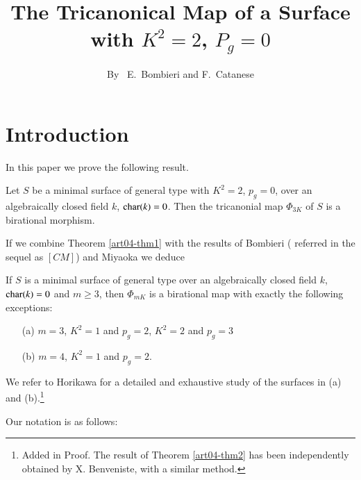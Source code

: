 \title{The Tricanonical Map of a Surface with \texorpdfstring{$K^{2}=2$, $P_{g}=0$}{K2}}\label{art04}

\author{By~ E.~Bombieri and F.~Catanese}

\date{}
\maketitle

\setcounter{page}{327}

\setcounter{pageoriginal}{278}
\section{Introduction}\label{art04-sec1}\pageoriginale
In this paper we prove the following result.

\begin{theorem}\label{art04-thm1}
Let $S$ be a minimal surface of general type with $K^{2}=2$,
$p_{g}=0$, over an algebraically closed field $k$, $\operatorname{char}
(k)=0$. Then the tricanonial map $\Phi_{3K}$ of $S$ is a birational
morphism. 
\end{theorem}

If we combine Theorem \ref{art04-thm1} with the results of
Bombieri (\cite{art04-key1} referred in the sequel as {$[CM]$}) and
Miyaoka \cite{art04-key4} we deduce

\begin{theorem}\label{art04-thm2}
If $S$ is a minimal surface of general type over an algebraically
closed field $k$, $\operatorname{char} (k)=0$ and $m\geq 3$, then $\Phi_{mK}$ is a
birational map with exactly the following exceptions:
\begin{itemize}
\item[\rm(a)] $m=3$, $K^{2}=1$ and $p_{g}=2$, $K^{2}=2$ and $p_{g}=3$

\item[\rm(b)] $m=4$, $K^{2}=1$ and $p_{g}=2$.
\end{itemize}
\end{theorem}

We refer to Horikawa \cite{art04-key3} for a detailed and exhaustive
study of the surfaces in (a) and (b).\footnote[2]{Added in Proof. The
result of Theorem \ref{art04-thm2} has been independently obtained by
X. Benveniste, with a similar method.}

Our notation is as follows:

